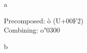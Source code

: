 \documentclass{article}
\begin{document}
a

Precomposed: ò (U+00F2)\\
Combining: o\char"0300

b
\end{document}
